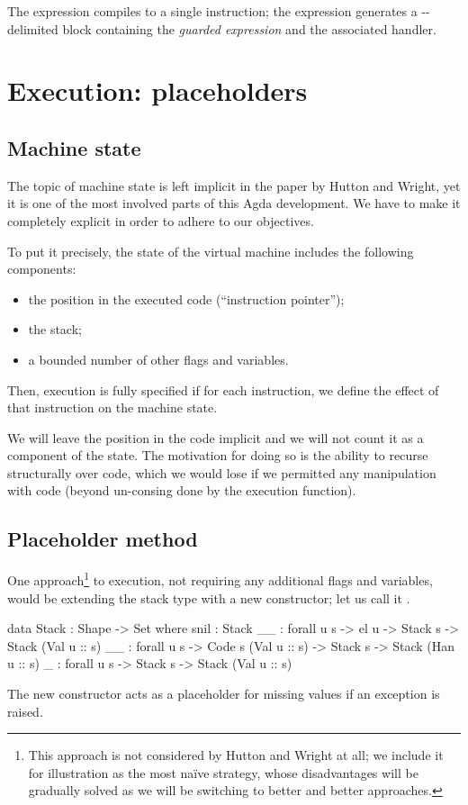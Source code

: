 The expression  compiles to a single  instruction;
the expression  generates a --delimited
block containing the \emph{guarded expression} and the associated handler.

\section{Execution: placeholders}

\subsection{Machine state}

The topic of machine state is left implicit in the paper by Hutton and Wright,
yet it is one of the most involved parts of this Agda development. We have to
make it completely explicit in order to adhere to our objectives.

To put it precisely, the state of the virtual machine includes
the following components:
\begin{itemize}
	\item the position in the executed code (``instruction pointer'');
	\item the stack;
	\item a bounded number of other flags and variables.
\end{itemize}

Then, execution is fully specified if for each instruction, we define the
effect of that instruction on the machine state.

We will leave the position in the code implicit and we will not count
it as a component of the state. The motivation for doing so is the ability to
recurse structurally over code, which we would lose if we permitted any
manipulation with code (beyond un-consing done by the execution function).

\subsection{Placeholder method}

One approach\footnote{This approach is not considered by Hutton and Wright at all;
we include it for illustration as the most na\"{i}ve strategy, whose disadvantages
will be gradually solved as we will be switching to better and better approaches.}
to execution, not requiring any additional flags and variables,
would be extending the stack type with a new constructor; let us call it
\ident{\void\scons\!\!\_}.
\begin{code}
  data Stack : Shape -> Set where
    snil : Stack \NIL
    _\scons\_ : forall {u s} -> el u -> Stack s -> Stack (Val u :: s)
    _\sconsh\_ : forall {u s} -> Code s (Val u :: s) -> Stack s -> Stack (Han u :: s)
    \void\scons\_ : forall {u s} -> Stack s -> Stack (Val u :: s)
\end{code}
The new constructor acts as a placeholder for missing values if an exception is raised.

